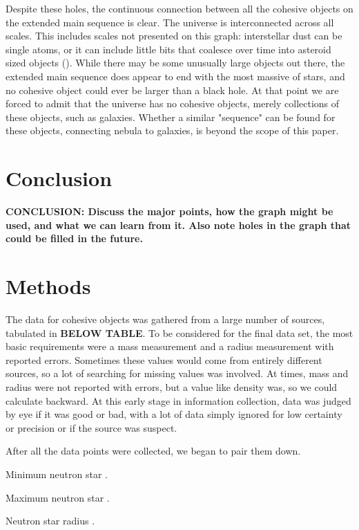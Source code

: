 \documentclass[twocolumn,linenumbers]{aastex631}
\begin{document}
Despite these holes, the continuous connection between all the cohesive objects on the extended main sequence is clear. The universe is interconnected across all scales. This includes scales not presented on this graph: interstellar dust can be single atoms, or it can include little bits that coalesce over time into asteroid sized objects (). While there may be some unusually large objects out there, the extended main sequence does appear to end with the most massive of stars, and no cohesive object could ever be larger than a black hole. At that point we are forced to admit that the universe has no cohesive objects, merely collections of these objects, such as galaxies. Whether a similar "sequence" can be found for these objects, connecting nebula to galaxies, is beyond the scope of this paper. 

\section{Conclusion} \label{sec:intro}

\textbf{\color{blue}CONCLUSION: Discuss the major points, how the graph might be used, and what we can learn from it. Also note holes in the graph that could be filled in the future. \color{black}}

\section{Methods} \label{sec:methods}

The data for cohesive objects was gathered from a large number of sources, tabulated in \textbf{\color{red}BELOW TABLE\color{black}}. To be considered for the final data set, the most basic requirements were a mass measurement and a radius measurement with reported errors. Sometimes these values would come from entirely different sources, so a lot of searching for missing values was involved. At times, mass and radius were not reported with errors, but a value like density was, so we could calculate backward. At this early stage in information collection, data was judged by eye if it was good or bad, with a lot of data simply ignored for low certainty or precision or if the source was suspect. 

After all the data points were collected, we began to pair them down. 

Minimum neutron star \citep{Suwa2018}. 

Maximum neutron star \citep{Romani2022}. 

Neutron star radius \citep{Ozel2016}. 
\end{document}
